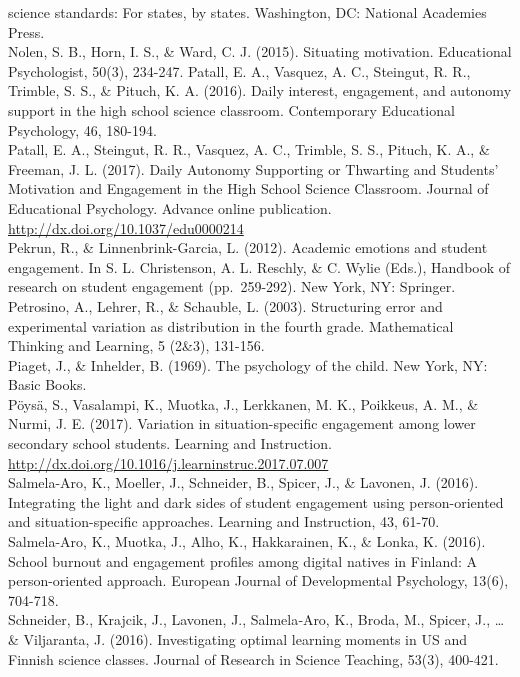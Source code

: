 \documentclass[]{msu-thesis}
\theoremstyle{definition}
\theoremstyle{definition}
\theoremstyle{definition}
\theoremstyle{remark}
\begin{document}
science standards: For states, by states. Washington, DC: National
Academies Press.\\
Nolen, S. B., Horn, I. S., \& Ward, C. J. (2015). Situating motivation.
Educational Psychologist, 50(3), 234-247. Patall, E. A., Vasquez, A. C.,
Steingut, R. R., Trimble, S. S., \& Pituch, K. A. (2016). Daily
interest, engagement, and autonomy support in the high school science
classroom. Contemporary Educational Psychology, 46, 180-194.\\
Patall, E. A., Steingut, R. R., Vasquez, A. C., Trimble, S. S., Pituch,
K. A., \& Freeman, J. L. (2017). Daily Autonomy Supporting or Thwarting
and Students' Motivation and Engagement in the High School Science
Classroom. Journal of Educational Psychology. Advance online
publication. \url{http://dx.doi.org/10.1037/edu0000214}\\
Pekrun, R., \& Linnenbrink-Garcia, L. (2012). Academic emotions and
student engagement. In S. L. Christenson, A. L. Reschly, \& C. Wylie
(Eds.), Handbook of research on student engagement (pp.~259-292). New
York, NY: Springer.\\
Petrosino, A., Lehrer, R., \& Schauble, L. (2003). Structuring error and
experimental variation as distribution in the fourth grade. Mathematical
Thinking and Learning, 5 (2\&3), 131-156.\\
Piaget, J., \& Inhelder, B. (1969). The psychology of the child. New
York, NY: Basic Books.\\
Pöysä, S., Vasalampi, K., Muotka, J., Lerkkanen, M. K., Poikkeus, A. M.,
\& Nurmi, J. E. (2017). Variation in situation-specific engagement among
lower secondary school students. Learning and Instruction.
\url{http://dx.doi.org/10.1016/j.learninstruc.2017.07.007}\\
Salmela-Aro, K., Moeller, J., Schneider, B., Spicer, J., \& Lavonen, J.
(2016). Integrating the light and dark sides of student engagement using
person-oriented and situation-specific approaches. Learning and
Instruction, 43, 61-70.\\
Salmela-Aro, K., Muotka, J., Alho, K., Hakkarainen, K., \& Lonka, K.
(2016). School burnout and engagement profiles among digital natives in
Finland: A person-oriented approach. European Journal of Developmental
Psychology, 13(6), 704-718.\\
Schneider, B., Krajcik, J., Lavonen, J., Salmela‐Aro, K., Broda, M.,
Spicer, J., \ldots{} \& Viljaranta, J. (2016). Investigating optimal
learning moments in US and Finnish science classes. Journal of Research
in Science Teaching, 53(3), 400-421.\\
\end{document}
